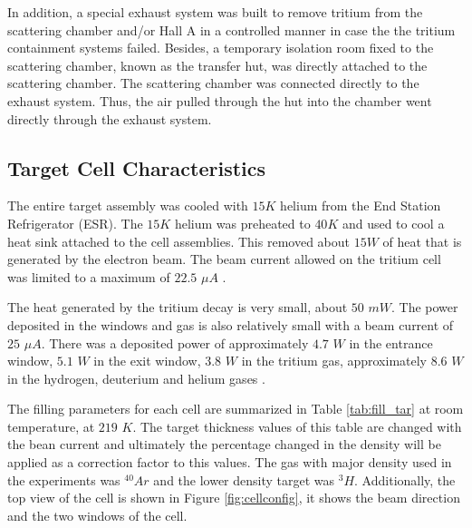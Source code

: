 \documentclass[final,5p,times,twocolumn]{elsarticle}
\begin{document}
In addition, a special exhaust system was built to remove tritium from the scattering chamber and/or Hall A in a controlled manner 
in case the the tritium containment systems failed. Besides, a temporary isolation room fixed to the scattering chamber, known as 
the transfer hut, was directly attached to the scattering chamber. The scattering chamber was connected directly to the exhaust system. 
Thus, the air pulled through the hut into the chamber went directly through the exhaust system.  


\subsection{Target Cell Characteristics}

The entire target assembly was cooled with $15K$ helium from the End Station Refrigerator (ESR). The $15K$ helium was preheated to $40K$ 
and used to cool a heat sink attached to the cell assemblies. This removed about $15W$ of heat that is generated by the electron beam. 
The beam current allowed on the tritium cell was limited to a maximum of $22.5$ $\mu A$ \cite{engreport}.

The heat generated by the tritium decay is very small, about $50$ $mW$. The power deposited in the windows and gas is also relatively 
small with a beam current of $25$ $\mu A$. There was a deposited power of approximately $4.7$ $W$ in the entrance window, $5.1$ $W$ 
in the exit window, $3.8$ $W$ in the tritium gas, approximately $8.6$ $W$ in the hydrogen, deuterium and helium gases \cite{celldes}.
 
The filling parameters for each cell are summarized in Table \ref{tab:fill_tar} at room temperature, at $219$ $K$. The target thickness 
values of this table are changed with the bean current and ultimately the percentage changed in the density will be applied as a correction 
factor to this values. The gas with major density used in the experiments was $^{40}Ar$ and the lower density target was $^{3}H$.  Additionally, 
the top view of the cell is shown in Figure \ref{fig:cellconfig},  it shows the beam direction and the two windows of the cell.
\end{document}
